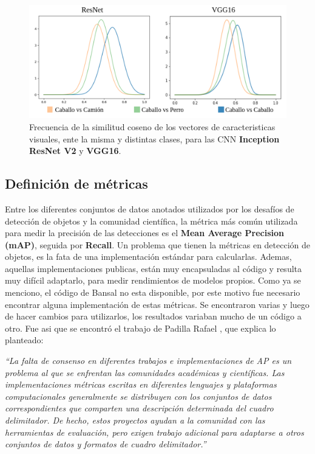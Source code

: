 \begin{figure}
	\centering
	\includegraphics[width=1\linewidth]{img/vgg-vs-resnet}
	\caption{Frecuencia de la similitud coseno de los vectores de caracteristicas visuales, ente la misma y distintas clases, para las CNN  \textbf{Inception ResNet V2} y \textbf{VGG16}.}
	\label{fig:vgg-vs-resnet}
\end{figure}

\subsection{Definición de métricas} \label{ssec:definiciondemetricas}
Entre los diferentes conjuntos de datos anotados utilizados por los desafíos de detección de objetos y la comunidad científica, la métrica más común utilizada para medir la precisión de las detecciones es el  \textbf{Mean Average Precision (mAP)}, seguida por \textbf{Recall}. Un problema que tienen la métricas en detección de objetos, es la fata de una implementación estándar para calcularlas. Ademas, aquellas implementaciones publicas, están muy encapsuladas al código y resulta muy difícil adaptarlo, para medir rendimientos de modelos propios. Como ya se menciono, el código de Bansal \cite{bansal2018zero} no esta disponible, por este motivo fue necesario encontrar alguna implementación de estas métricas. Se encontraron varias y luego de hacer cambios para utilizarlos, los resultados variaban mucho de un código a otro.
Fue asi que se encontró el trabajo de Padilla Rafael \cite{padilla2020survey}, que explica lo planteado:\\

\begin{center}
	\textit{``La falta de consenso en diferentes trabajos e implementaciones de AP es un problema al que se enfrentan las comunidades académicas y científicas. Las implementaciones métricas escritas en diferentes lenguajes y plataformas computacionales generalmente se distribuyen con los conjuntos de datos correspondientes que comparten una descripción determinada del cuadro delimitador. De hecho, estos proyectos ayudan a la comunidad con las herramientas de evaluación, pero exigen trabajo adicional para adaptarse a otros conjuntos de datos y formatos de cuadro delimitador.''}\\
\end{center}

